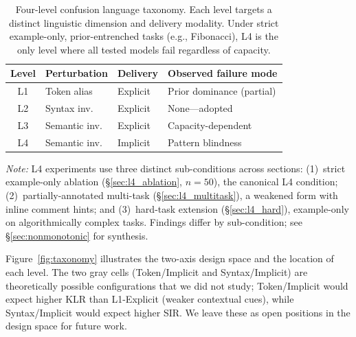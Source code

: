 \begin{table}[!t]
\centering
\caption{Four-level confusion language taxonomy. Each level targets a distinct linguistic dimension and delivery modality. Under strict example-only, prior-entrenched tasks (e.g., Fibonacci), L4 is the only level where all tested models fail regardless of capacity.}
\label{tab:levels}
\footnotesize
\begin{tabular}{@{}clp{1.5cm}p{2.8cm}@{}}
\toprule
\textbf{Level} & \textbf{Perturbation} & \textbf{Delivery} & \textbf{Observed failure mode} \\
\midrule
L1 & Token alias & Explicit & Prior dominance (partial) \\
L2 & Syntax inv. & Explicit & None---adopted \\
L3 & Semantic inv. & Explicit & Capacity-dependent \\
L4 & Semantic inv. & Implicit & Pattern blindness \\
\bottomrule
\end{tabular}
\par\smallskip
\raggedright\scriptsize\textit{Note:} L4 experiments use three distinct sub-conditions across sections: (1)~strict example-only ablation (§\ref{sec:l4_ablation}, $n=50$), the canonical L4 condition; (2)~partially-annotated multi-task (§\ref{sec:l4_multitask}), a weakened form with inline comment hints; and (3)~hard-task extension (§\ref{sec:l4_hard}), example-only on algorithmically complex tasks. Findings differ by sub-condition; see §\ref{sec:nonmonotonic} for synthesis.
\end{table}

Figure~\ref{fig:taxonomy} illustrates the two-axis design space and the location of each level.
The two gray cells (Token/Implicit and Syntax/Implicit) are theoretically possible configurations that we did not study; Token/Implicit would expect higher KLR than L1-Explicit (weaker contextual cues), while Syntax/Implicit would expect higher SIR. We leave these as open positions in the design space for future work.

